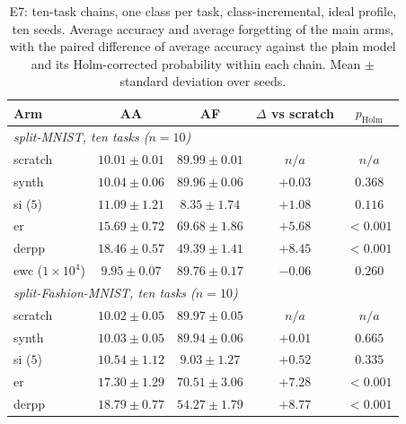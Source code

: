 \begin{table}[ht]
\centering
\small
\setlength{\tabcolsep}{4pt}
\caption{E7: ten-task chains, one class per task, class-incremental, ideal profile, ten seeds. Average accuracy and average forgetting of the main arms, with the paired difference of average accuracy against the plain model and its Holm-corrected probability within each chain. Mean $\pm$ standard deviation over seeds.}
\label{tab:e7_chains}
\begin{tabular}{lcccc}
\toprule
Arm & AA & AF & $\Delta$ vs scratch & $p_{\text{Holm}}$ \\
\midrule
\multicolumn{5}{l}{\textit{split-MNIST, ten tasks ($n=10$)}} \\
scratch & $10.01 \pm 0.01$ & $89.99 \pm 0.01$ & $n/a$ & $n/a$ \\
synth & $10.04 \pm 0.06$ & $89.96 \pm 0.06$ & $+0.03$ & $0.368$ \\
si ($5$) & $11.09 \pm 1.21$ & $8.35 \pm 1.74$ & $+1.08$ & $0.116$ \\
er & $15.69 \pm 0.72$ & $69.68 \pm 1.86$ & $+5.68$ & $<0.001$ \\
derpp & $18.46 \pm 0.57$ & $49.39 \pm 1.41$ & $+8.45$ & $<0.001$ \\
ewc ($1{\times}10^4$) & $9.95 \pm 0.07$ & $89.76 \pm 0.17$ & $-0.06$ & $0.260$ \\
\midrule
\multicolumn{5}{l}{\textit{split-Fashion-MNIST, ten tasks ($n=10$)}} \\
scratch & $10.02 \pm 0.05$ & $89.97 \pm 0.05$ & $n/a$ & $n/a$ \\
synth & $10.03 \pm 0.05$ & $89.94 \pm 0.06$ & $+0.01$ & $0.665$ \\
si ($5$) & $10.54 \pm 1.12$ & $9.03 \pm 1.27$ & $+0.52$ & $0.335$ \\
er & $17.30 \pm 1.29$ & $70.51 \pm 3.06$ & $+7.28$ & $<0.001$ \\
derpp & $18.79 \pm 0.77$ & $54.27 \pm 1.79$ & $+8.77$ & $<0.001$ \\
\bottomrule
\end{tabular}
\end{table}
